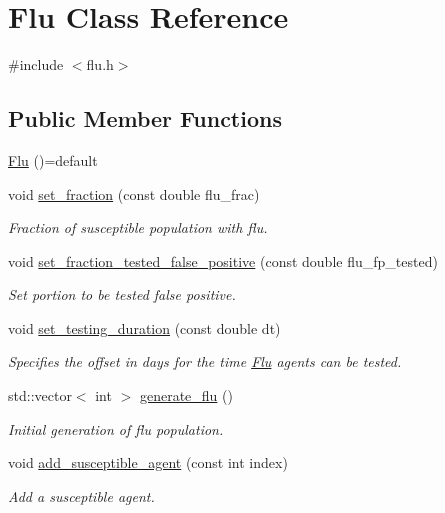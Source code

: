 \hypertarget{classFlu}{}\section{Flu Class Reference}
\label{classFlu}


{\ttfamily \#include $<$flu.\+h$>$}

\subsection*{Public Member Functions}
\begin{DoxyCompactItemize}
\item 
\hyperlink{classFlu_a3714dffff12b88b76547388c14c72ea4}{Flu} ()=default
\item 
void \hyperlink{classFlu_af4537e15218d60518ccb9de9df2aa69c}{set\+\_\+fraction} (const double flu\+\_\+frac)
\begin{DoxyCompactList}\small\item\em Fraction of susceptible population with flu. \end{DoxyCompactList}\item 
void \hyperlink{classFlu_ad2f9eaba0cde52dc931fd37fe8158165}{set\+\_\+fraction\+\_\+tested\+\_\+false\+\_\+positive} (const double flu\+\_\+fp\+\_\+tested)
\begin{DoxyCompactList}\small\item\em Set portion to be tested false positive. \end{DoxyCompactList}\item 
void \hyperlink{classFlu_af84acec1b3a8cfee13cba841bd6b6914}{set\+\_\+testing\+\_\+duration} (const double dt)
\begin{DoxyCompactList}\small\item\em Specifies the offset in days for the time \hyperlink{classFlu}{Flu} agents can be tested. \end{DoxyCompactList}\item 
std\+::vector$<$ int $>$ \hyperlink{classFlu_a86d9c227590e493eb7ecb26e55b2a1eb}{generate\+\_\+flu} ()
\begin{DoxyCompactList}\small\item\em Initial generation of flu population. \end{DoxyCompactList}\item 
void \hyperlink{classFlu_a8ec452eddf296a91812b3eaa29183958}{add\+\_\+susceptible\+\_\+agent} (const int index)
\begin{DoxyCompactList}\small\item\em Add a susceptible agent. \end{DoxyCompactList}\item 

\end{DoxyCompactItemize}
